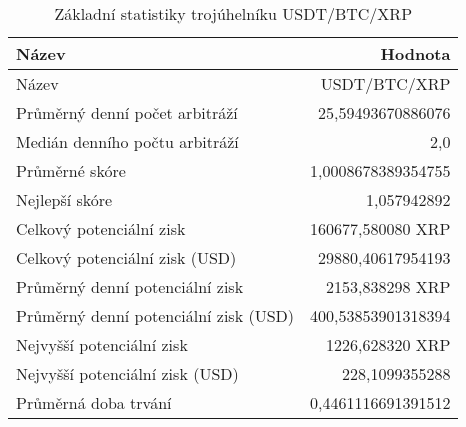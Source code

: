 \begin{table}\centering
\caption{Základní statistiky trojúhelníku USDT/BTC/XRP}
\label{USDTBTCXRP_stats}
\begin{tabular}{|| l | r ||}
\hline Název & Hodnota \\ 
\hline\hline Název & USDT/BTC/XRP \\ 
\hline Průměrný denní počet arbitráží & 25,59493670886076 \\ 
\hline Medián denního počtu arbitráží & 2,0 \\ 
\hline Průměrné skóre & 1,0008678389354755 \\ 
\hline Nejlepší skóre & 1,057942892 \\ 
\hline Celkový potenciální zisk & 160677,580080 XRP \\ 
\hline Celkový potenciální zisk (USD) & 29880,40617954193 \\ 
\hline Průměrný denní potenciální zisk & 2153,838298 XRP \\ 
\hline Průměrný denní potenciální zisk (USD) & 400,53853901318394 \\ 
\hline Nejvyšší potenciální zisk & 1226,628320 XRP \\ 
\hline Nejvyšší potenciální zisk (USD) & 228,1099355288 \\ 
\hline Průměrná doba trvání & 0,4461116691391512 \\ 
\hline
\end{tabular}
\end{table}